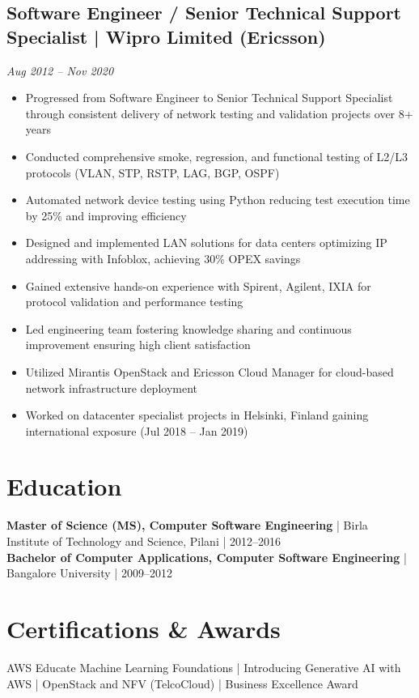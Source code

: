 \documentclass[10pt,a4paper]{article}
\begin{document}
\subsection*{Software Engineer / Senior Technical Support Specialist | Wipro Limited (Ericsson)}
\hfill \textit{Aug 2012 -- Nov 2020}
\begin{itemize}
    \item Progressed from Software Engineer to Senior Technical Support Specialist through consistent delivery of network testing and validation projects over 8+ years
    \item Conducted comprehensive smoke, regression, and functional testing of L2/L3 protocols (VLAN, STP, RSTP, LAG, BGP, OSPF)
    \item Automated network device testing using Python reducing test execution time by 25\% and improving efficiency
    \item Designed and implemented LAN solutions for data centers optimizing IP addressing with Infoblox, achieving 30\% OPEX savings
    \item Gained extensive hands-on experience with Spirent, Agilent, IXIA for protocol validation and performance testing
    \item Led engineering team fostering knowledge sharing and continuous improvement ensuring high client satisfaction
    \item Utilized Mirantis OpenStack and Ericsson Cloud Manager for cloud-based network infrastructure deployment
    \item Worked on datacenter specialist projects in Helsinki, Finland gaining international exposure (Jul 2018 -- Jan 2019)
\end{itemize}

\vspace{-4pt}

\section*{Education}
\textbf{Master of Science (MS), Computer Software Engineering} | Birla Institute of Technology and Science, Pilani | 2012--2016\\
\textbf{Bachelor of Computer Applications, Computer Software Engineering} | Bangalore University | 2009--2012

\vspace{-4pt}

\section*{Certifications \& Awards}
AWS Educate Machine Learning Foundations | Introducing Generative AI with AWS | OpenStack and NFV (TelcoCloud) | Business Excellence Award
\end{document}
